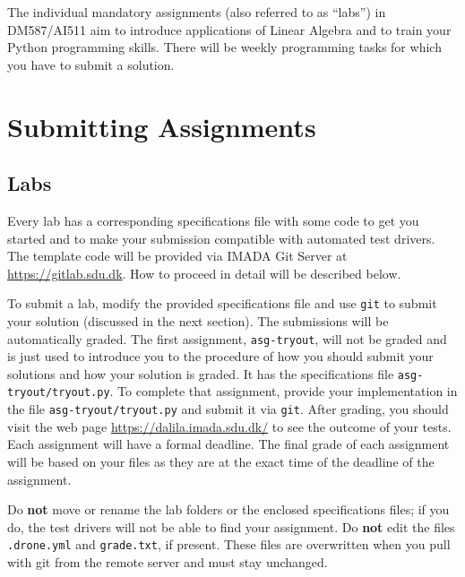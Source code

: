 
The individual mandatory assignments (also referred to as ``labs'') in DM587/AI511 aim to introduce applications of Linear Algebra and to train your Python programming skills. There will be weekly programming tasks for which you have to submit a solution.

\section*{Submitting Assignments} %

\subsection*{Labs}

Every lab has a corresponding specifications file with some code to get you started and to make your submission compatible with automated test drivers. The template code will be provided via IMADA Git Server at \url{https://gitlab.sdu.dk}. 
How to proceed in detail will be described below.


To submit a lab, modify the provided specifications file and use \texttt{git} to submit your solution (discussed in the next section).
The submissions will be automatically graded. 
The first assignment, \texttt{asg-tryout}, will not be graded and is just used to introduce you to the procedure of how you should submit your solutions and how your solution is graded. It has the specifications file \texttt{asg-tryout/tryout.py}.
To complete that assignment, provide your implementation in the file \texttt{asg-tryout/tryout.py} and submit it via \texttt{git}.
After grading, 
you should visit the web page \url{https://dalila.imada.sdu.dk/} to see the outcome of your tests. Each assignment will have a formal deadline. 
The final grade of each assignment will be based on your files as they are at the exact time of the deadline of the assignment.


\begin{warn}
Do \textbf{not} move or rename the lab folders or the enclosed
specifications files; if you do, the test drivers will not be able to
find your assignment. Do \textbf{not} edit the files \texttt{.drone.yml} and 
\texttt{grade.txt}, if present. These files are overwritten when you pull with git from
the remote server and must stay unchanged. 
\end{warn}



